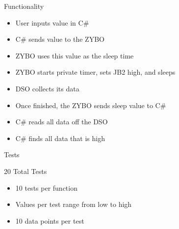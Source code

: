 \documentclass[pdf]{beamer}
\begin{document}
\begin{frame}{Functionality}

  \begin{itemize}
  \item User inputs value in C\#
  \item C\# sends value to the ZYBO
  \end{itemize}
  
  \pause

  \begin{itemize}
  \item ZYBO uses this value as the sleep time
  \item ZYBO starts private timer, sets JB2 high, and sleeps
  \item DSO collects its data
  \end{itemize}
  
  \pause
  
  \begin{itemize}
  \item Once finished, the ZYBO sends sleep value to C\#
  \item C\# reads all data off the DSO
  \item C\# finds all data that is high
  \end{itemize}

\end{frame}

\begin{frame}{Tests}

  20 Total Tests
  \begin{itemize}
  \item 10 tests per function
  \item Values per test range from low to high
  \item 10 data points per test
  \end{itemize}
    
\end{frame}
\end{document}
